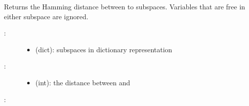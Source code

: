 \documentclass[letterpaper,10pt,english]{sphinxmanual}
\begin{document}
\begin{fulllineitems}
\label{\detokenize{StateTransitionGraphs:PyBoolNet.StateTransitionGraphs.hamming_distance}}
Returns the Hamming distance between to subspaces.
Variables that are free in either subspace are ignored.
\begin{description}
\item[{:}] \leavevmode\begin{itemize}
\item {} 
 (dict): subspaces in dictionary representation

\end{itemize}

\item[{:}] \leavevmode\begin{itemize}
\item {} 
 (int): the distance between  and 

\end{itemize}

\end{description}

:

\begin{sphinxVerbatim}[commandchars=\\\{\}]
 
 
\end{sphinxVerbatim}

\end{fulllineitems}
\end{document}
